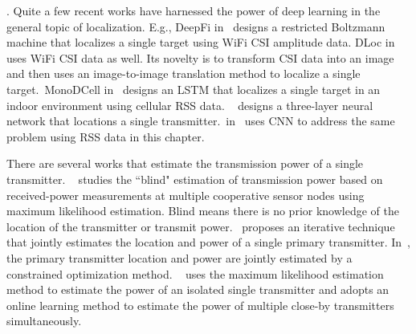 . 
Quite a few recent works have harnessed the power of deep learning in the general topic of localization.
E.g., DeepFi in~\cite{DeepFi2016} designs a restricted Boltzmann machine that localizes a single target using WiFi CSI amplitude data. 
DLoc in~\cite{mobicom20-deeploc} uses WiFi CSI data as well. 
Its novelty is to transform CSI data into an image and then uses an image-to-image translation method to localize a single target.~MonoDCell 
in~\cite{sigspatial19-monodcell} designs an LSTM that localizes a single target in an indoor environment using cellular RSS data.
~\cite{pimrc2021-localize} designs a three-layer neural network that locations a single transmitter.~\deeptx in~\cite{icccn20-deeptxfinder} 
uses CNN to address the same \mtl problem using RSS data in this chapter.

 There are several works that estimate the transmission power of a single transmitter.
~\cite{PowerEstimate2010Zafer} studies the ``blind" estimation of transmission power based on received-power measurements at 
multiple cooperative sensor nodes using maximum likelihood estimation. Blind means there is no prior knowledge of the location of the 
transmitter or transmit power.~\cite{Ureten2011powerlocation} proposes an iterative technique that jointly estimates the location and 
power of a single primary transmitter.
In~\cite{icoin2007-powerposition}, the primary transmitter location and power are jointly estimated by a constrained optimization method.
~\cite{ipsn20-mtl} uses the maximum likelihood estimation method to estimate the power of an isolated single transmitter and 
adopts an online learning method to estimate the power of multiple close-by transmitters simultaneously.

